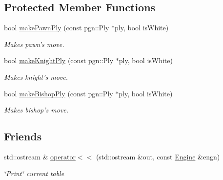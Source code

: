 \subsection*{Protected Member Functions}
\begin{DoxyCompactItemize}
\item 
bool \hyperlink{classChEngn_1_1Engine_a5ee94d0b489d05ef5e643cb9cfe5ac1a}{makePawnPly} (const pgn::Ply $\ast$ply, bool isWhite)
\begin{DoxyCompactList}\small\item\em Makes pawn's move. \item\end{DoxyCompactList}\item 
bool \hyperlink{classChEngn_1_1Engine_a1dc6130dd986b0b0b8960a3c1e99f87c}{makeKnightPly} (const pgn::Ply $\ast$ply, bool isWhite)
\begin{DoxyCompactList}\small\item\em Makes knight's move. \item\end{DoxyCompactList}\item 
bool \hyperlink{classChEngn_1_1Engine_a066d78b55f68fe6dbcd6581f64ae512a}{makeBishopPly} (const pgn::Ply $\ast$ply, bool isWhite)
\begin{DoxyCompactList}\small\item\em Makes bishop's move. \item\end{DoxyCompactList}\end{DoxyCompactItemize}
\subsection*{Friends}
\begin{DoxyCompactItemize}
\item 
\hypertarget{classChEngn_1_1Engine_a886da6512b271d26a1fee49a317d2308}{
std::ostream \& \hyperlink{classChEngn_1_1Engine_a886da6512b271d26a1fee49a317d2308}{operator$<$$<$} (std::ostream \&out, const \hyperlink{classChEngn_1_1Engine}{Engine} \&engn)}
\label{classChEngn_1_1Engine_a886da6512b271d26a1fee49a317d2308}

\begin{DoxyCompactList}\small\item\em \char`\"{}Print\char`\"{} current table \item\end{DoxyCompactList}\end{DoxyCompactItemize}


